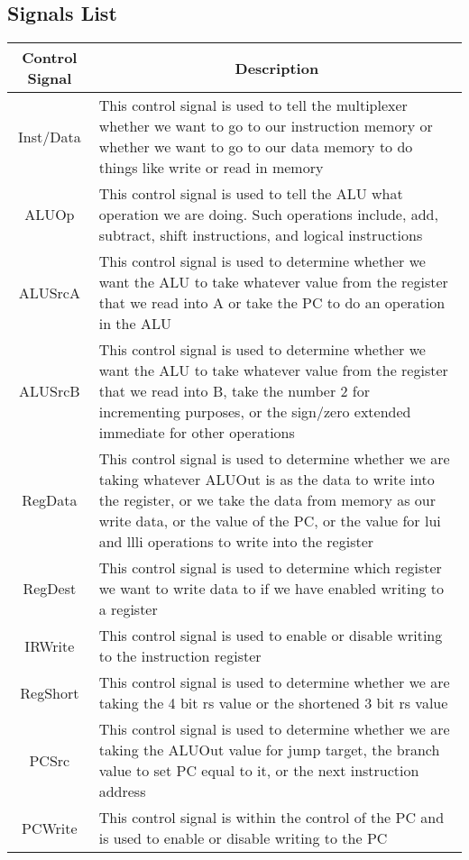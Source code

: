 \documentclass[12pt, a4paper]{report}
\begin{document}
		\subsection{Signals List}
		{\renewcommand{\arraystretch}{1.5}
			\begin{longtable}[c]{c|p{11cm}}
				Control Signal & \multicolumn{1}{c}{Description} \\
				\hline
				Inst/Data & This control signal is used to tell the multiplexer whether we want to go to our instruction memory or whether we want to go to our data memory to do things like write or read in memory \\
				\hline
				ALUOp & This control signal is used to tell the ALU what operation we are doing.  Such operations include, add, subtract, shift instructions, and logical instructions \\
				\hline
				ALUSrcA & This control signal is used to determine whether we want the ALU to take whatever value from the register that we read into A or take the PC to do an operation in the ALU \\
				\hline
				ALUSrcB & This control signal is used to determine whether we want the ALU to take whatever value from the register that we read into B, take the number 2 for incrementing purposes, or the sign/zero extended immediate for other operations  \\
				\hline
				RegData & This control signal is used to determine whether we are taking whatever ALUOut is as the data to write into the register, or we take the data from memory as our write data, or the value of the PC, or the value for lui and llli operations to write into the register \\
				\hline
				RegDest & This control signal is used to determine which register we want to write data to if we have enabled writing to a register \\
				\hline
				IRWrite & This control signal is used to enable or disable writing to the instruction register \\
				\hline
				RegShort & This control signal is used to determine whether we are taking the 4 bit rs value or the shortened 3 bit rs value \\
				PCSrc & This control signal is used to determine whether we are taking the ALUOut value for jump target, the branch value to set PC equal to it, or the next instruction address  \\
				\hline
				PCWrite & This control signal is within the control of the PC and is used to enable or disable writing to the PC \\

\end{longtable}}
\end{document}

